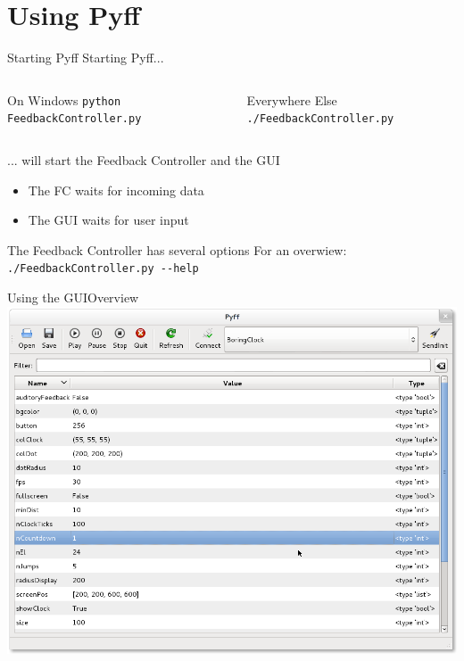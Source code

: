 \documentclass{beamer}
\begin{document}
\section{Using Pyff}

\begin{frame}[fragile]{Starting Pyff}
    Starting Pyff...
    \vfill
    \begin{columns}[T]
            \begin{block}{On Windows}
                \verb+python FeedbackController.py+
            \end{block}
            \begin{block}{Everywhere Else}
                \verb+./FeedbackController.py+
            \end{block}
    \end{columns}
    \vfill
    ... will start the Feedback Controller and the GUI
    \begin{itemize}
        \item The FC waits for incoming data
        \item The GUI waits for user input
    \end{itemize}
    \vfill
    \begin{block}{The Feedback Controller has several options}
        For an overwiew:\\
        \verb+./FeedbackController.py --help+
    \end{block}
\end{frame}

\begin{frame}{Using the GUI}{Overview}
    \includegraphics[width=0.9\linewidth]{gui}
\end{frame}
\end{document}
